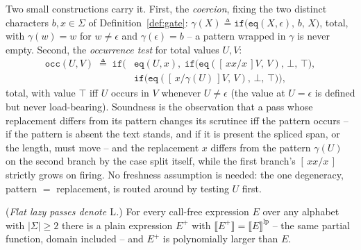\documentclass[runningheads,envcountsect]{llncs}
\begin{document}
Two small constructions carry it. First, the \emph{coercion}, fixing the two distinct characters $b, x \in \Sigma$ of Definition~\ref{def:gate}: $\gamma(X) \triangleq \mathtt{if}\big(\mathtt{eq}(X, \epsilon),\, b,\, X\big)$, total, with $\gamma(w) = w$ for $w \neq \epsilon$ and $\gamma(\epsilon) = b$ -- a pattern wrapped in $\gamma$ is never empty. Second, the \emph{occurrence test} for total values $U, V$:
\begin{align*}
    \mathtt{occ}(U,V) \;\triangleq\; \mathtt{if}\Big(&\mathtt{eq}(U, x),\;
        \mathtt{if}\big(\mathtt{eq}([\,xx/x\,]V,\, V),\, \bot,\, \top\big),\\
        &\mathtt{if}\big(\mathtt{eq}([\,x/\gamma(U)\,]V,\, V),\, \bot,\, \top\big)\Big),
\end{align*}
total, with value $\top$ iff $U$ occurs in $V$ whenever $U \neq \epsilon$ (the value at $U = \epsilon$ is defined but never load-bearing). Soundness is the observation that a pass whose replacement differs from its pattern changes its scrutinee iff the pattern occurs -- if the pattern is absent the text stands, and if it is present the spliced span, or the length, must move -- and the replacement $x$ differs from the pattern $\gamma(U)$ on the second branch by the case split itself, while the first branch's $[\,xx/x\,]$ strictly grows on firing. No freshness assumption is needed: the one degeneracy, pattern $=$ replacement, is routed around by testing $U$ first.

\begin{theorem}
    (\emph{Flat lazy passes denote $\mathrm{L}$.})
    \label{thm:flatlazy}
    For every call-free expression $E$ over any alphabet with $|\Sigma| \geq 2$ there is a plain expression $E^{+}$ with $\llbracket E^{+} \rrbracket = \llbracket E \rrbracket^{\mathrm{lp}}$ -- the same partial function, domain included -- and $E^{+}$ is polynomially larger than $E$.
\end{theorem}
\end{document}
